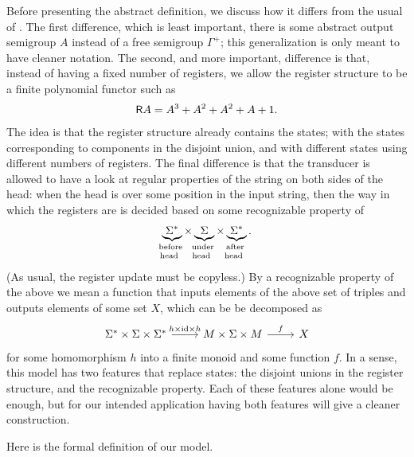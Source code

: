 Before presenting the abstract definition, we discuss how it differs  from the usual of \sst. The first difference, which is least important, there is some abstract output semigroup $A$ instead of a free semigroup $\Gamma^+$; this generalization is only meant to have cleaner notation. The second, and more important, difference is that, instead of having a fixed number of registers, we allow the register structure to be a finite polynomial functor such as 
\begin{align*}
\mathsf R A = A^3 + A^2 + A^2 + A + 1.
\end{align*}
The idea is that the register structure already contains the states; with the states corresponding to components in the disjoint union, and with  different states using different numbers of registers. The final difference is that the transducer is allowed to have a look at regular properties of the string on both sides of the head:  when the head is over some position in the input string, then the way in which the registers are is decided based on  some recognizable property of 
\begin{align*}
\myunderbrace{\Sigma^*}{before \\ head } \times 
\myunderbrace{\Sigma}{under \\ head } \times 
\myunderbrace{\Sigma^*}{after \\ head }.
\end{align*}
(As usual, the register update must be copyless.)
By a recognizable property of the above we mean a function that inputs elements of the above set of triples  and outputs elements of some set $X$, which can be be decomposed as 
\[
\begin{tikzcd}
    \Sigma^* \times \Sigma \times \Sigma^* 
    \ar[r,"h \times \id \times h"] 
    &
    M \times \Sigma \times M
\ar[r,"f"]
& 
X
\end{tikzcd}
\] 
for some homomorphism $h$ into a finite monoid and some function $f$. In a sense, this model has two features that replace states: the disjoint unions in the register structure, and the recognizable property. Each of these features alone would be enough, but for our intended application having both features will give a cleaner construction.

Here is the formal definition of our \sst model.

